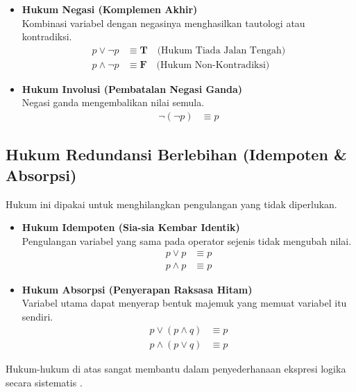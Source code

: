 \begin{itemize}
    \item \textbf{Hukum Negasi (Komplemen Akhir)} \\
    Kombinasi variabel dengan negasinya menghasilkan tautologi atau kontradiksi.
    \begin{align*}
        p \vee \neg p &\equiv \mathbf{T} \quad \text{(Hukum Tiada Jalan Tengah)} \\
        p \wedge \neg p &\equiv \mathbf{F} \quad \text{(Hukum Non-Kontradiksi)}
    \end{align*}

    \item \textbf{Hukum Involusi (Pembatalan Negasi Ganda)} \\
    Negasi ganda mengembalikan nilai semula.
    \begin{align*}
        \neg(\neg p) &\equiv p 
    \end{align*}
\end{itemize}

\subsection{Hukum Redundansi Berlebihan (Idempoten \& Absorpsi)}
Hukum ini dipakai untuk menghilangkan pengulangan yang tidak diperlukan.

\begin{itemize}
    \item \textbf{Hukum Idempoten (Sia-sia Kembar Identik)} \\
    Pengulangan variabel yang sama pada operator sejenis tidak mengubah nilai.
    \begin{align*}
        p \vee p &\equiv p \\
        p \wedge p &\equiv p
    \end{align*}

    \item \textbf{Hukum Absorpsi (Penyerapan Raksasa Hitam)} \\
    Variabel utama dapat menyerap bentuk majemuk yang memuat variabel itu sendiri.
    \begin{align*}
        p \vee (p \wedge q) &\equiv p \\
        p \wedge (p \vee q) &\equiv p
    \end{align*}
\end{itemize}
Hukum-hukum di atas sangat membantu dalam penyederhanaan ekspresi logika secara sistematis \cite{wiki_proplogic}.
